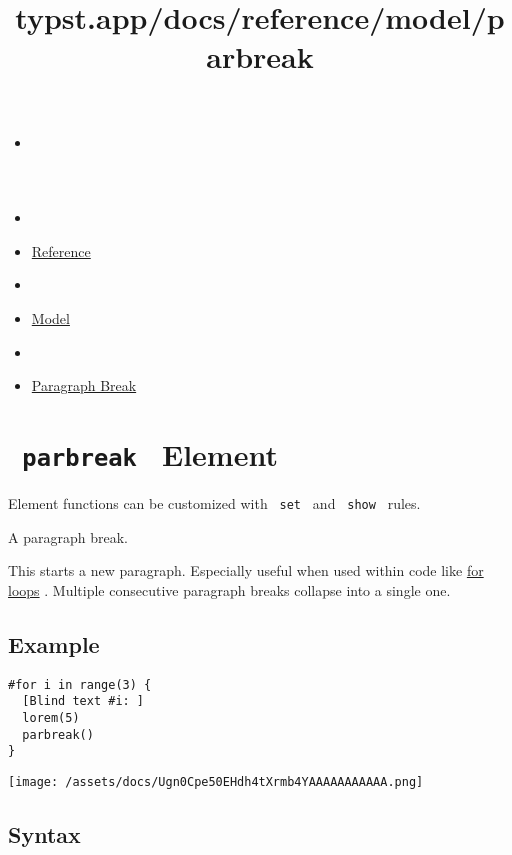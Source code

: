\title{typst.app/docs/reference/model/parbreak}

\begin{itemize}
\tightlist
\item
  \href{/docs}{}
\item
  
\item
  \href{/docs/reference/}{Reference}
\item
  
\item
  \href{/docs/reference/model/}{Model}
\item
  
\item
  \href{/docs/reference/model/parbreak/}{Paragraph Break}
\end{itemize}

\section{\texorpdfstring{\texttt{\ parbreak\ } {{ Element
}}}{ parbreak   Element }}\label{summary}

\label{element-tooltip}
Element functions can be customized with \texttt{\ set\ } and
\texttt{\ show\ } rules.

A paragraph break.

This starts a new paragraph. Especially useful when used within code
like \href{/docs/reference/scripting/\#loops}{for loops} . Multiple
consecutive paragraph breaks collapse into a single one.

\subsection{Example}\label{example}

\begin{verbatim}
#for i in range(3) {
  [Blind text #i: ]
  lorem(5)
  parbreak()
}
\end{verbatim}

\texttt{[image: /assets/docs/Ugn0Cpe50EHdh4tXrmb4YAAAAAAAAAAA.png]}

\subsection{Syntax}\label{syntax}

